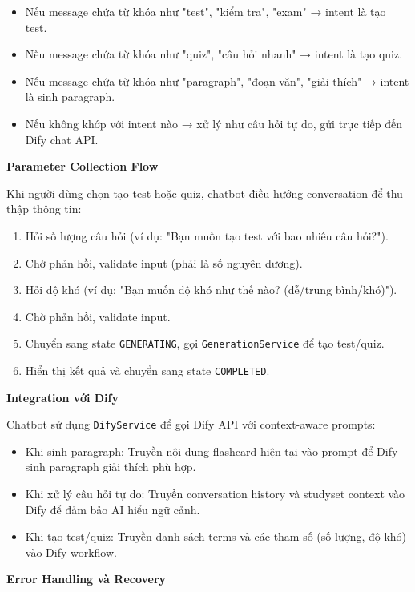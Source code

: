 \documentclass[../DoAn.tex]{subfiles}
\begin{document}
\begin{itemize}
    \item Nếu message chứa từ khóa như "test", "kiểm tra", "exam" → intent là tạo test.
    \item Nếu message chứa từ khóa như "quiz", "câu hỏi nhanh" → intent là tạo quiz.
    \item Nếu message chứa từ khóa như "paragraph", "đoạn văn", "giải thích" → intent là sinh paragraph.
    \item Nếu không khớp với intent nào → xử lý như câu hỏi tự do, gửi trực tiếp đến Dify chat API.
\end{itemize}

\textbf{Parameter Collection Flow}

Khi người dùng chọn tạo test hoặc quiz, chatbot điều hướng conversation để thu thập thông tin:

\begin{enumerate}
    \item Hỏi số lượng câu hỏi (ví dụ: "Bạn muốn tạo test với bao nhiêu câu hỏi?").
    \item Chờ phản hồi, validate input (phải là số nguyên dương).
    \item Hỏi độ khó (ví dụ: "Bạn muốn độ khó như thế nào? (dễ/trung bình/khó)").
    \item Chờ phản hồi, validate input.
    \item Chuyển sang state \texttt{GENERATING}, gọi \texttt{GenerationService} để tạo test/quiz.
    \item Hiển thị kết quả và chuyển sang state \texttt{COMPLETED}.
\end{enumerate}

\textbf{Integration với Dify}

Chatbot sử dụng \texttt{DifyService} để gọi Dify API với context-aware prompts:

\begin{itemize}
    \item Khi sinh paragraph: Truyền nội dung flashcard hiện tại vào prompt để Dify sinh paragraph giải thích phù hợp.
    \item Khi xử lý câu hỏi tự do: Truyền conversation history và studyset context vào Dify để đảm bảo AI hiểu ngữ cảnh.
    \item Khi tạo test/quiz: Truyền danh sách terms và các tham số (số lượng, độ khó) vào Dify workflow.
\end{itemize}

\textbf{Error Handling và Recovery}
\end{document}
